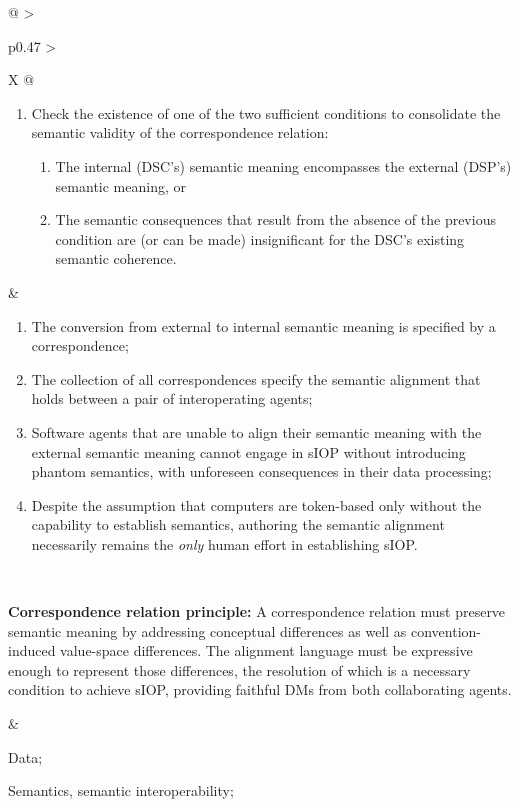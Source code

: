 \begin{xltabular}[l]{\linewidth}{@{} >{\small\raggedright\arraybackslash}p{0.47\linewidth} >{\small\raggedright\arraybackslash}X @{}}
\begin{enumerate}[left=6pt, nosep]
  \item Check the existence of one of the two sufficient conditions to consolidate the semantic validity of the correspondence relation: 
  \begin{enumerate}
    \item The internal (DSC's) semantic meaning encompasses the external (DSP's) semantic meaning, or
    \item The semantic consequences that result from the absence of the previous condition are (or can be made) insignificant for the DSC's existing semantic coherence.
  \end{enumerate}
\end{enumerate}
&
\begin{enumerate}[left=10pt, nosep]
  \item The conversion from external to internal semantic meaning is specified by a correspondence;
  \item The collection of all correspondences specify the semantic alignment that holds between a pair of interoperating agents;
  \item Software agents that are unable to align their semantic meaning with the external semantic meaning cannot engage in sIOP without introducing phantom semantics, with unforeseen consequences in their data processing;
  \item Despite the assumption that computers are token-based only without the capability to establish semantics, authoring the semantic alignment necessarily remains the \emph{only} human effort in establishing sIOP.
\end{enumerate} \\
%
%
%
\begin{mmdp}\label{dp:alignment-language}{\bfseries Correspondence relation principle:}
\quad A correspondence relation must preserve semantic meaning by addressing conceptual differences as well as convention-induced value-space differences. The alignment language must be expressive enough to represent those differences, the resolution of which is a necessary condition to achieve sIOP, providing faithful DMs from both collaborating agents. \end{mmdp}
&
\begin{description}[labelwidth=3.7cm,leftmargin=3.7cm+1ex,nosep,topsep=2ex,labelsep=1ex,font=\bfseries]
  \item[Type of information:] Data;
  \item[Quality attributes:] Semantics, semantic interoperability;

\end{description}
\end{xltabular}
